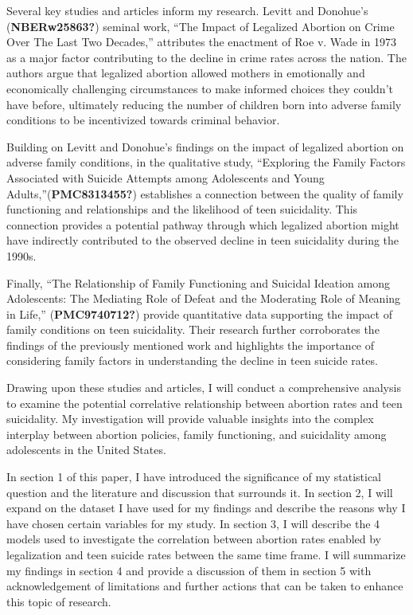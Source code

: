 \documentclass[
  letterpaper,
  DIV=11,
  numbers=noendperiod]{scrartcl}
\begin{document}
Several key studies and articles inform my research. Levitt and
Donohue's (\textbf{NBERw25863?}) seminal work, ``The Impact of Legalized
Abortion on Crime Over The Last Two Decades,'' attributes the enactment
of Roe v. Wade in 1973 as a major factor contributing to the decline in
crime rates across the nation. The authors argue that legalized abortion
allowed mothers in emotionally and economically challenging
circumstances to make informed choices they couldn't have before,
ultimately reducing the number of children born into adverse family
conditions to be incentivized towards criminal behavior.

Building on Levitt and Donohue's findings on the impact of legalized
abortion on adverse family conditions, in the qualitative study,
``Exploring the Family Factors Associated with Suicide Attempts among
Adolescents and Young Adults,''(\textbf{PMC8313455?}) establishes a
connection between the quality of family functioning and relationships
and the likelihood of teen suicidality. This connection provides a
potential pathway through which legalized abortion might have indirectly
contributed to the observed decline in teen suicidality during the
1990s.

Finally, ``The Relationship of Family Functioning and Suicidal Ideation
among Adolescents: The Mediating Role of Defeat and the Moderating Role
of Meaning in Life,'' (\textbf{PMC9740712?}) provide quantitative data
supporting the impact of family conditions on teen suicidality. Their
research further corroborates the findings of the previously mentioned
work and highlights the importance of considering family factors in
understanding the decline in teen suicide rates.

Drawing upon these studies and articles, I will conduct a comprehensive
analysis to examine the potential correlative relationship between
abortion rates and teen suicidality. My investigation will provide
valuable insights into the complex interplay between abortion policies,
family functioning, and suicidality among adolescents in the United
States.

In section 1 of this paper, I have introduced the significance of my
statistical question and the literature and discussion that surrounds
it. In section 2, I will expand on the dataset I have used for my
findings and describe the reasons why I have chosen certain variables
for my study. In section 3, I will describe the 4 models used to
investigate the correlation between abortion rates enabled by
legalization and teen suicide rates between the same time frame. I will
summarize my findings in section 4 and provide a discussion of them in
section 5 with acknowledgement of limitations and further actions that
can be taken to enhance this topic of research.
\end{document}
